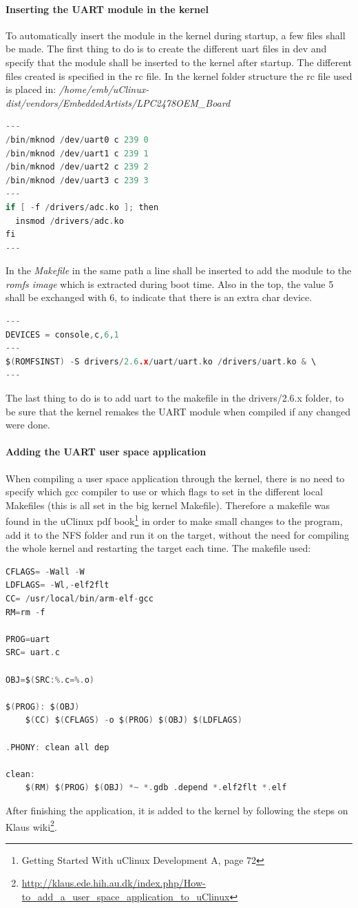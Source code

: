 \paragraph{Inserting the UART module in the kernel}
To automatically insert the module in the kernel during startup, a few files shall be made. The first thing to do is to create the different uart files in \/dev and specify that the module shall be inserted to the kernel after startup. The different files created is specified in the rc file. In the kernel folder structure the rc file used is placed in: \textit{/home/emb/uClinux-dist/vendors/EmbeddedArtists/LPC2478OEM\_Board}

\begin{lstlisting}[language=c]
---
/bin/mknod /dev/uart0 c 239 0 
/bin/mknod /dev/uart1 c 239 1
/bin/mknod /dev/uart2 c 239 2
/bin/mknod /dev/uart3 c 239 3
---
if [ -f /drivers/adc.ko ]; then
  insmod /drivers/adc.ko
fi
---
\end{lstlisting}
In the \textit{Makefile} in the same path a line shall be inserted to add the module to the \textit{romfs image} which is extracted during boot time. Also in the top, the value 5 shall be exchanged with 6, to indicate that there is an extra char device.
\begin{lstlisting}[language=c]
---
DEVICES = console,c,6,1
---
$(ROMFSINST) -S drivers/2.6.x/uart/uart.ko /drivers/uart.ko & \
---
\end{lstlisting}
The last thing to do is to add uart to the makefile in the drivers/2.6.x folder, to be sure that the kernel remakes the UART module when compiled if any changed were done. 
\paragraph{Adding the UART user space application}
When compiling a user space application through the kernel, there is no need to specify which gcc compiler to use or which flags to set in the different local Makefiles (this is all set in the big kernel Makefile). Therefore a makefile was found in the uClinux pdf book\footnote{Getting Started With uClinux Development A, page 72} in order to make small changes to the program, add it to the NFS folder and run it on the target, without the need for compiling the whole kernel and restarting the target each time. The makefile used:
\begin{lstlisting}[language=c]
CFLAGS= -Wall -W
LDFLAGS= -Wl,-elf2flt
CC= /usr/local/bin/arm-elf-gcc
RM=rm -f

PROG=uart
SRC= uart.c

OBJ=$(SRC:%.c=%.o)

$(PROG): $(OBJ)
	$(CC) $(CFLAGS) -o $(PROG) $(OBJ) $(LDFLAGS)

.PHONY: clean all dep

clean:
	$(RM) $(PROG) $(OBJ) *~ *.gdb .depend *.elf2flt *.elf
\end{lstlisting}
After finishing the application, it is added to the kernel by following the steps on Klaus wiki\footnote{\url{http://klaus.ede.hih.au.dk/index.php/How-to_add_a_user_space_application_to_uClinux}}.
